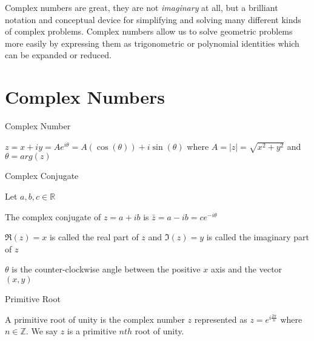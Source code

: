 \documentclass[10pt]{article}
\begin{document}
Complex numbers are great, they are not \emph{imaginary} at all, but a brilliant notation and conceptual device for simplifying and solving many different kinds of complex problems. Complex numbers allow us to solve geometric problems more easily by expressing them as trigonometric or polynomial identities which can be expanded or reduced. 

\section*{Complex Numbers}

\begin{defn}{Complex Number}

$z = x + iy = Ae^{i\theta} = A(\cos{(\theta)}) + i \sin{(\theta)}$ where $A = |z| = \sqrt{x^{2} + y^{2}}$ and $ \theta = arg(z)$

\end{defn}
 
\bigskip

\begin{defn}{Complex Conjugate}

Let $a, b, c \in \mathbb{R}$ 

The complex conjugate of $z = a + ib$ is $\bar{z} = a - ib = ce^{-i\theta}$
\end{defn}

\bigskip

\begin{nota}

$\Re{(z)} = x$ is called the real part of $z$ and $\Im{(z)} = y$ is called the imaginary part of $z$

\end{nota}

\bigskip

\begin{nota}

$\theta$ is the counter-clockwise angle between the positive $x$ axis and the vector $(x,y)$

\end{nota}

\bigskip

\begin{defn}{Primitive Root}

A primitive root of unity is the complex number $z$ represented as $z = e^{i\frac{2\pi}{n}}$ where $n \in \mathbb{Z}$. We say $z$ is a primitive $nth$ root of unity.
\end{defn}

\medskip
\end{document}
